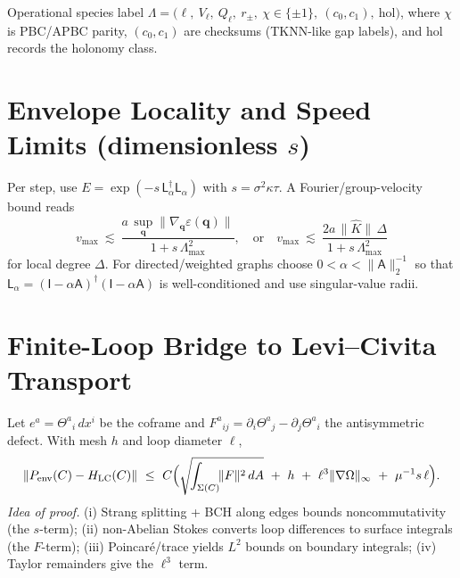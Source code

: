 \documentclass[11pt]{article}
\newcommand{\Id}{\mathsf{I}}
\newcommand{\Adj}{\mathsf{A}}
\newcommand{\Lap}{\mathsf{L}_\alpha}
\newcommand{\Thet}{\Theta}
\begin{document}
\begin{mydef}{Operational species label}
\(\Lambda=\big(\ell,\ V_\ell,\ Q_\ell,\ r_\pm,\ \chi\in\{\pm1\},\ (c_0,c_1),\ \mathrm{hol}\big)\),
where $\chi$ is PBC/APBC parity, $(c_0,c_1)$ are checksums (TKNN-like gap labels), and $\mathrm{hol}$ records the holonomy class.
\end{mydef}

\section{Envelope Locality and Speed Limits (dimensionless $s$)}
Per step, use $E=\exp(-s\,\Lap^\dagger\Lap)$ with $s=\sigma^2\kappa\tau$.
A Fourier/group-velocity bound reads
\begin{equation}
v_{\max}\ \lesssim\ \frac{a\,\sup_{\mathbf q}\|\nabla_{\mathbf q}\varepsilon(\mathbf q)\|}{1+s\,\Lambda_{\max}^2},
\quad\text{or}\quad
v_{\max}\ \lesssim\ \frac{2 a\,\|\widehat K\|\,\Delta}{1+s\,\Lambda_{\max}^2}
\end{equation}
for local degree $\Delta$.
For directed/weighted graphs choose $0<\alpha<\|\Adj\|_2^{-1}$ so that $\Lap=(\Id-\alpha\Adj)^\dagger(\Id-\alpha\Adj)$ is well-conditioned and use singular-value radii.

\section{Finite-Loop Bridge to Levi--Civita Transport}
Let $e^a=\Thet^a{}_i\,dx^i$ be the coframe and $F^a{}_{ij}=\partial_i\Thet^a{}_j-\partial_j\Thet^a{}_i$ the antisymmetric defect.
With mesh $h$ and loop diameter $\ell$,
\begin{equation}
\|P_{\rm env}(C)-H_{\rm LC}(C)\|\ \le\ C\Big(\sqrt{\!\int_{\Sigma(C)}\!\!\|F\|^2\,dA}\ +\ h\ +\ \ell^3\|\nabla\Omega\|_\infty\ +\ \mu^{-1}s\,\ell\Big).
\label{eq:bridge}
\end{equation}
\emph{Idea of proof.} (i) Strang splitting + BCH along edges bounds noncommutativity (the $s$-term);
(ii) non-Abelian Stokes converts loop differences to surface integrals (the $F$-term); (iii) Poincar\'e/trace yields $L^2$ bounds on boundary integrals; (iv) Taylor remainders give the $\ell^3$ term.
\end{document}
